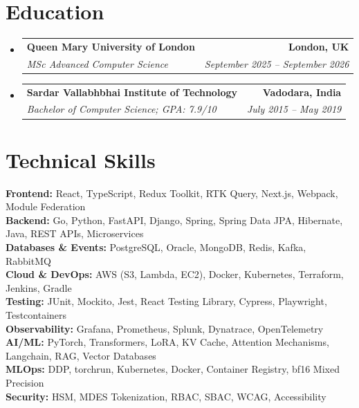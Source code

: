 \documentclass[letterpaper,11pt]{article}
\makeatletter
\newcommand{\resumeSubheading}[4]{
  \vspace{-3pt}\item
    \begin{tabular*}{1.0\textwidth}[t]{l@{\extracolsep{\fill}}r}
      \textbf{#1} & \textbf{\small #2} \\
      \textit{\small#3} & \textit{\small #4} \\
    \end{tabular*}\vspace{-7pt}
}
\newcommand{\resumeSubHeadingListStart}{\begin{itemize}[leftmargin=0.0in, label={}]}
\newcommand{\resumeSubHeadingListEnd}{\end{itemize}}
\makeatother
\begin{document}
\section{Education}
  \resumeSubHeadingListStart
    \resumeSubheading
      {Queen Mary University of London}{London, UK}
      {MSc Advanced Computer Science}{September 2025 -- September 2026}
    \resumeSubheading
      {Sardar Vallabhbhai Institute of Technology}{Vadodara, India}
      {Bachelor of Computer Science; GPA: 7.9/10}{July 2015 -- May 2019}
  \resumeSubHeadingListEnd

\section{Technical Skills}
\vspace{-7pt}
\begin{itemize}
[leftmargin=0.15in, label={}]\small{\item{
\textbf{Frontend:}{ React, TypeScript, Redux Toolkit, RTK Query, Next.js, Webpack, Module Federation} \\
\textbf{Backend:}{ Go, Python, FastAPI, Django, Spring, Spring Data JPA, Hibernate, Java, REST APIs, Microservices} \\
\textbf{Databases \& Events:}{ PostgreSQL, Oracle, MongoDB, Redis, Kafka, RabbitMQ} \\
\textbf{Cloud \& DevOps:}{ AWS (S3, Lambda, EC2), Docker, Kubernetes, Terraform, Jenkins, Gradle} \\
\textbf{Testing:}{ JUnit, Mockito, Jest, React Testing Library, Cypress, Playwright, Testcontainers} \\
\textbf{Observability:}{ Grafana, Prometheus, Splunk, Dynatrace, OpenTelemetry} \\
\textbf{AI/ML:}{ PyTorch, Transformers, LoRA, KV Cache, Attention Mechanisms, Langchain, RAG, Vector Databases} \\
\textbf{MLOps:}{ DDP, torchrun, Kubernetes, Docker, Container Registry, bf16 Mixed Precision} \\
\textbf{Security:}{ HSM, MDES Tokenization, RBAC, SBAC, WCAG, Accessibility}
}}
\end{itemize}
\end{document}
